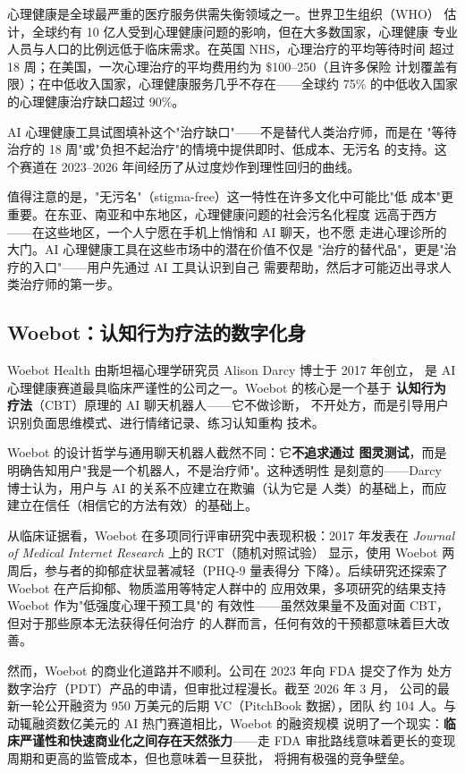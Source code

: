 心理健康是全球最严重的医疗服务供需失衡领域之一。世界卫生组织（WHO）
估计，全球约有 10 亿人受到心理健康问题的影响，但在大多数国家，心理健康
专业人员与人口的比例远低于临床需求。在英国 NHS，心理治疗的平均等待时间
超过 18 周；在美国，一次心理治疗的平均费用约为 \$100--250（且许多保险
计划覆盖有限）；在中低收入国家，心理健康服务几乎不存在——全球约
75\% 的中低收入国家的心理健康治疗缺口超过 90\%。

AI 心理健康工具试图填补这个"治疗缺口"——不是替代人类治疗师，而是在
"等待治疗的 18 周"或"负担不起治疗"的情境中提供即时、低成本、无污名
的支持。这个赛道在 2023--2026 年间经历了从过度炒作到理性回归的曲线。

值得注意的是，"无污名"（stigma-free）这一特性在许多文化中可能比"低
成本"更重要。在东亚、南亚和中东地区，心理健康问题的社会污名化程度
远高于西方——在这些地区，一个人宁愿在手机上悄悄和 AI 聊天，也不愿
走进心理诊所的大门。AI 心理健康工具在这些市场中的潜在价值不仅是
"治疗的替代品"，更是"治疗的入口"——用户先通过 AI 工具认识到自己
需要帮助，然后才可能迈出寻求人类治疗师的第一步。


\subsection{Woebot：认知行为疗法的数字化身}
\label{subsec:woebot}

Woebot Health 由斯坦福心理学研究员 Alison Darcy 博士于 2017 年创立，
是 AI 心理健康赛道最具临床严谨性的公司之一。Woebot 的核心是一个基于
\textbf{认知行为疗法}（CBT）原理的 AI 聊天机器人——它不做诊断，
不开处方，而是引导用户识别负面思维模式、进行情绪记录、练习认知重构
技术。

Woebot 的设计哲学与通用聊天机器人截然不同：它\textbf{不追求通过
图灵测试}，而是明确告知用户"我是一个机器人，不是治疗师"。这种透明性
是刻意的——Darcy 博士认为，用户与 AI 的关系不应建立在欺骗（认为它是
人类）的基础上，而应建立在信任（相信它的方法有效）的基础上。

从临床证据看，Woebot 在多项同行评审研究中表现积极：2017 年发表在
\textit{Journal of Medical Internet Research} 上的 RCT（随机对照试验）
显示，使用 Woebot 两周后，参与者的抑郁症状显著减轻（PHQ-9 量表得分
下降）。后续研究还探索了 Woebot 在产后抑郁、物质滥用等特定人群中的
应用效果，多项研究的结果支持 Woebot 作为"低强度心理干预工具"的
有效性——虽然效果量不及面对面 CBT，但对于那些原本无法获得任何治疗
的人群而言，任何有效的干预都意味着巨大改善。

然而，Woebot 的商业化道路并不顺利。公司在 2023 年向 FDA 提交了作为
处方数字治疗（PDT）产品的申请，但审批过程漫长。截至 2026 年 3 月，
公司的最新一轮公开融资为 950 万美元的后期 VC（PitchBook 数据），团队
约 104 人。与动辄融资数亿美元的 AI 热门赛道相比，Woebot 的融资规模
说明了一个现实：\textbf{临床严谨性和快速商业化之间存在天然张力}——走
FDA 审批路线意味着更长的变现周期和更高的监管成本，但也意味着一旦获批，
将拥有极强的竞争壁垒。

